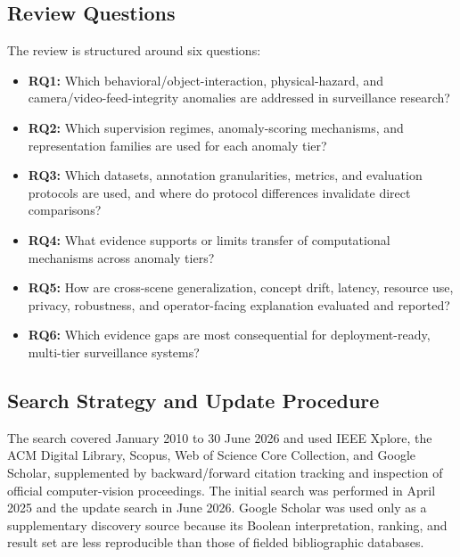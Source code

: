\documentclass[10pt,a4paper]{article}
\begin{document}
\subsection{Review Questions}
\label{subsec:review_questions}
The review is structured around six questions:
\begin{itemize}
    \item \textbf{RQ1:} Which behavioral/object-interaction, physical-hazard, and camera/video-feed-integrity anomalies are addressed in surveillance research?
    \item \textbf{RQ2:} Which supervision regimes, anomaly-scoring mechanisms, and representation families are used for each anomaly tier?
    \item \textbf{RQ3:} Which datasets, annotation granularities, metrics, and evaluation protocols are used, and where do protocol differences invalidate direct comparisons?
    \item \textbf{RQ4:} What evidence supports or limits transfer of computational mechanisms across anomaly tiers?
    \item \textbf{RQ5:} How are cross-scene generalization, concept drift, latency, resource use, privacy, robustness, and operator-facing explanation evaluated and reported?
    \item \textbf{RQ6:} Which evidence gaps are most consequential for deployment-ready, multi-tier surveillance systems?
\end{itemize}

\subsection{Search Strategy and Update Procedure}
\label{subsec:search_strategy}
The search covered January 2010 to 30 June 2026 and used IEEE Xplore, the ACM Digital Library, Scopus, Web of Science Core Collection, and Google Scholar, supplemented by backward/forward citation tracking and inspection of official computer-vision proceedings. The initial search was performed in April 2025 and the update search in June 2026. Google Scholar was used only as a supplementary discovery source because its Boolean interpretation, ranking, and result set are less reproducible than those of fielded bibliographic databases.
\end{document}
